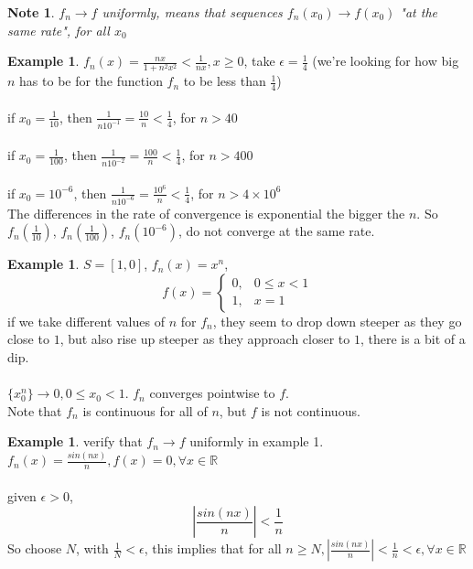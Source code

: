 \documentclass[12pt]{article}
\theoremstyle{plain}
\newtheorem*{note}{Note}
\theoremstyle{definition}
\newtheorem{example}[theorem]{Example}
\begin{document}
\begin{note}
	$f_n \to f$ uniformly, means that sequences $f_n (x_0) \to f(x_0)$ "at the same rate", for all $x_0$
\end{note}

\begin{example}
	$f_n (x) =  \frac{nx}{1 + n^2 x^2} < \frac{1}{nx}, x \geq 0$, take $\epsilon = \frac{1}{4}$
	(we're looking for how big $n$ has to be for the function $f_n$ to be less than $\frac{1}{4}$)\\
	\\
	if $x_0 = \frac{1}{10}$, then $\frac{1}{n 10^{-1}} = \frac{10}{n} < \frac{1}{4}$, for $n > 40$\\
	\\
	if $x_0 = \frac{1}{100}$, then $\frac{1}{n 10^{-2}} = \frac{100}{n} < \frac{1}{4}$, for $n > 400$\\
	\\
	if $x_0 = 10^{-6}$, then $\frac{1}{n 10^{-6}} = \frac{10^6}{n} < \frac{1}{4}$, for $n > 4 \times 10^6$\\
	The differences in the rate of convergence is exponential the bigger the $n$. So $f_n (\frac{1}{10})$, $f_n (\frac{1}{100})$, $f_n (10^{-6})$, do not converge at the same rate.
\end{example}

\begin{example}
	$S = [1,0]$, $f_n (x) = x^n$,
	$$f(x) = \begin{cases}
		0, &0 \leq x < 1\\
		1, &x = 1
	\end{cases}
$$
if we take different values of $n$ for $f_n$, they seem to drop down steeper as they go close to $1$, but also rise up steeper as they approach closer to $1$, there is a bit of a dip.\\
\\
$\{ x_0^n \} \to 0, 0 \leq x_0 < 1$. $f_n$ converges pointwise to $f$.\\
Note that $f_n$ is continuous for all of $n$, but $f$ is not continuous.
\end{example}

\begin{example}
	verify that $f_n \to f$ uniformly in example 1.\\
	$f_n (x) = \frac{sin(nx)}{n}, f(x) = 0, \forall x \in \mathbb{R}$\\
	\\
	given $\epsilon > 0$,
	$$|\frac{sin(nx)}{n}| < \frac{1}{n}$$
	So choose $N$, with $\frac{1}{N} < \epsilon$, this implies that for all $n \geq N, |\frac{sin(nx)}{n}| < \frac{1}{n} < \epsilon, \forall x \in \mathbb{R}$
\end{example}
\end{document}
